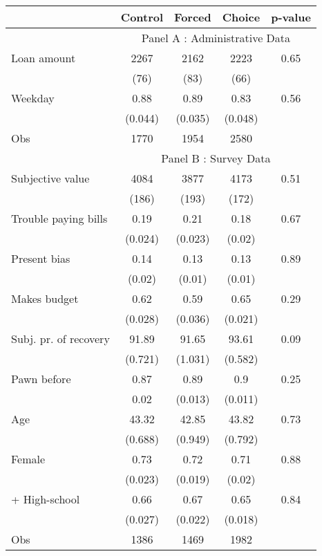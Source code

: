 \begin{tabular}{lcccc}
\toprule
& \multicolumn{1}{p{4.545em}}{Control} & \multicolumn{1}{p{4.955em}}{Forced} & \multicolumn{1}{p{3.455em}}{Choice} & \multicolumn{1}{p{3.455em}}{p-value} \\
\midrule
      & \multicolumn{4}{c}{Panel A : Administrative Data} \\
\midrule
\midrule
Loan amount  & 2267  & 2162  & 2223  & 0.65 \\
      & (76)  & (83)  & (66)  &  \\
Weekday & 0.88  & 0.89  & 0.83  & 0.56 \\
      & (0.044) & (0.035) & (0.048) &  \\
\midrule
Obs   & 1770  & 1954  & 2580  &  \\
\midrule
      & \multicolumn{4}{c}{Panel B : Survey Data} \\
\midrule
\midrule
Subjective value & 4084  & 3877  & 4173  & 0.51 \\
      & (186) & (193) & (172) &  \\
Trouble paying bills & 0.19  & 0.21  & 0.18  & 0.67 \\
      & (0.024) & (0.023) & (0.02) &  \\
Present bias & 0.14  & 0.13  & 0.13  & 0.89 \\
      & (0.02) & (0.01) & (0.01) &  \\
Makes budget & 0.62  & 0.59  & 0.65  & 0.29 \\
      & (0.028) & (0.036) & (0.021) &  \\
Subj. pr. of recovery & 91.89 & 91.65 & 93.61 & 0.09 \\
      & (0.721) & (1.031) & (0.582) &  \\
Pawn before & 0.87  & 0.89  & 0.9   & 0.25 \\
      & 0.02  & (0.013) & (0.011) &  \\
Age   & 43.32 & 42.85 & 43.82 & 0.73 \\
      & (0.688) & (0.949) & (0.792) &  \\
Female & 0.73  & 0.72  & 0.71  & 0.88 \\
      & (0.023) & (0.019) & (0.02) &  \\
+ High-school & 0.66  & 0.67  & 0.65  & 0.84 \\
      & (0.027) & (0.022) & (0.018) &  \\
\midrule
Obs   & 1386  & 1469  & 1982  &  \\
\bottomrule
\bottomrule
\end{tabular}%
